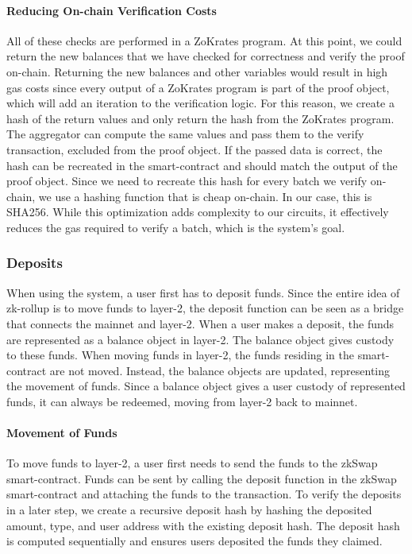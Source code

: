 \documentclass[../../thesis.tex]{subfiles}
\begin{document}
\paragraph{Reducing On-chain Verification Costs} \label{exec_and_reduce}
All of these checks are performed in a ZoKrates program. At this point, we could return the new balances that we have checked for correctness and verify the proof on-chain. Returning the new balances and other variables would result in high gas costs since every output of a ZoKrates program is part of the proof object, which will add an iteration to the verification logic. For this reason, we create a hash of the return values and only return the hash from the ZoKrates program. The aggregator can compute the same values and pass them to the verify transaction, excluded from the proof object. If the passed data is correct, the hash can be recreated in the smart-contract and should match the output of the proof object. Since we need to recreate this hash for every batch we verify on-chain, we use a hashing function that is cheap on-chain. In our case, this is SHA256. While this optimization adds complexity to our circuits, it effectively reduces the gas required to verify a batch, which is the system's goal.

\subsubsection{Deposits}
When using the system, a user first has to deposit funds. Since the entire idea of zk-rollup is to move funds to layer-2, the deposit function can be seen as a bridge that connects the mainnet and layer-2. When a user makes a deposit, the funds are represented as a balance object in layer-2. The balance object gives custody to these funds. When moving funds in layer-2, the funds residing in the smart-contract are not moved. Instead, the balance objects are updated, representing the movement of funds. Since a balance object gives a user custody of represented funds, it can always be redeemed, moving from layer-2 back to mainnet. 

\paragraph{Movement of Funds}
To move funds to layer-2, a user first needs to send the funds to the zkSwap smart-contract. Funds can be sent by calling the deposit function in the zkSwap smart-contract and attaching the funds to the transaction. To verify the deposits in a later step, we create a recursive deposit hash by hashing the deposited amount, type, and user address with the existing deposit hash. The deposit hash is computed sequentially and ensures users deposited the funds they claimed.
\end{document}
